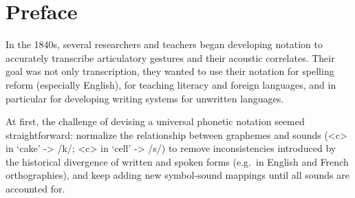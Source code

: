 \chapter{Preface}
\label{preface}






In the 1840s, several researchers and teachers began developing notation to
accurately transcribe articulatory gestures and their acoustic correlates. Their
goal was not only transcription, they wanted to use their notation for spelling
reform (especially English), for teaching literacy and foreign languages, and in
particular for developing writing systems for unwritten languages.

At first, the challenge of devising a universal phonetic notation seemed
straightforward: normalize the relationship between graphemes and sounds (<c> in
`cake' -> /k/; <c> in `cell' -> /s/) to remove inconsistencies introduced by the
historical divergence of written and spoken forms (e.g.\ in English and French
orthographies), and keep adding new symbol-sound mappings until all sounds are
accounted for.


